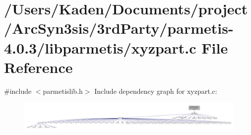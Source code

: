 \hypertarget{a00419}{}\section{/\+Users/\+Kaden/\+Documents/project/\+Arc\+Syn3sis/3rd\+Party/parmetis-\/4.0.3/libparmetis/xyzpart.c File Reference}
\label{a00419}
{\ttfamily \#include $<$parmetislib.\+h$>$}\newline
Include dependency graph for xyzpart.\+c\+:\nopagebreak
\begin{figure}[H]
\begin{center}
\leavevmode
\includegraphics[width=350pt]{a00420}
\end{center}
\end{figure}
